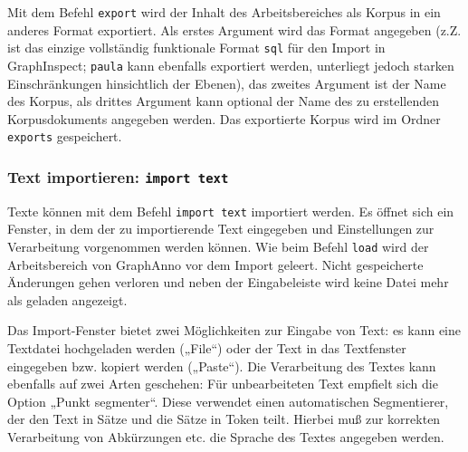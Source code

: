 \documentclass[12pt]{scrartcl}
\begin{document}
Mit dem Befehl \texttt{export} wird der Inhalt des Arbeitsbereiches als Korpus in ein anderes Format exportiert. Als erstes Argument wird das Format angegeben (z.Z. ist das einzige vollständig funktionale Format \texttt{sql} für den Import in GraphInspect; \texttt{paula} kann ebenfalls exportiert werden, unterliegt jedoch starken Einschränkungen hinsichtlich der Ebenen), das zweites Argument ist der Name des Korpus, als drittes Argument kann optional der Name des zu erstellenden Korpusdokuments angegeben werden. Das exportierte Korpus wird im Ordner \texttt{exports} gespeichert.


\subsubsection{Text importieren: \texttt{import text}}

Texte können mit dem Befehl \texttt{import text} importiert werden. Es öffnet sich ein Fenster, in dem der zu importierende Text eingegeben und Einstellungen zur Verarbeitung vorgenommen werden können.
Wie beim Befehl \texttt{load} wird der Arbeitsbereich von GraphAnno vor dem Import geleert. Nicht gespeicherte Änderungen gehen verloren und neben der Eingabeleiste wird keine Datei mehr als geladen angezeigt.

Das Import-Fenster bietet zwei Möglichkeiten zur Eingabe von Text: es kann eine Textdatei hochgeladen werden („File“) oder der Text in das Textfenster eingegeben bzw. kopiert werden („Paste“). Die Verarbeitung des Textes kann ebenfalls auf zwei Arten geschehen: Für unbearbeiteten Text empfielt sich die Option „Punkt segmenter“. Diese verwendet einen automatischen Segmentierer, der den Text in Sätze und die Sätze in Token teilt. Hierbei muß zur korrekten Verarbeitung von Abkürzungen etc. die Sprache des Textes angegeben werden.
\end{document}
